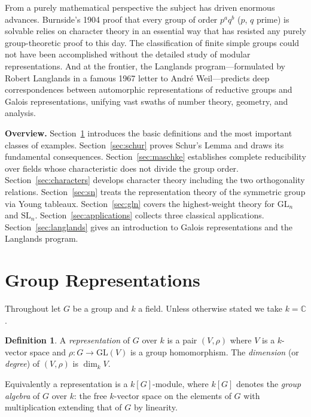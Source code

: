 \documentclass[12pt,a4paper]{amsart}
\theoremstyle{definition}
\newtheorem{definition}[theorem]{Definition}
\begin{document}
From a purely mathematical perspective the subject has driven enormous advances.
Burnside's 1904 proof that every group of order $p^a q^b$ ($p$, $q$ prime) is
solvable relies on character theory in an essential way that has resisted any
purely group-theoretic proof to this day.  The classification of finite simple
groups could not have been accomplished without the detailed study of modular
representations.  And at the frontier, the Langlands program---formulated by
Robert Langlands in a famous 1967 letter to André Weil---predicts deep
correspondences between automorphic representations of reductive groups and Galois
representations, unifying vast swaths of number theory, geometry, and analysis.

\medskip

\noindent\textbf{Overview.}  Section~\ref{sec:basic} introduces the basic
definitions and the most important classes of examples.  Section~\ref{sec:schur}
proves Schur's Lemma and draws its fundamental consequences.
Section~\ref{sec:maschke} establishes complete reducibility over fields whose
characteristic does not divide the group order.  Section~\ref{sec:characters}
develops character theory including the two orthogonality relations.
Section~\ref{sec:sn} treats the representation theory of the symmetric group via
Young tableaux.  Section~\ref{sec:gln} covers the highest-weight theory for
$\mathrm{GL}_n$ and $\mathrm{SL}_n$.  Section~\ref{sec:applications} collects
three classical applications.  Section~\ref{sec:langlands} gives an introduction
to Galois representations and the Langlands program.

\section{Group Representations}
\label{sec:basic}

Throughout let $G$ be a group and $k$ a field.  Unless otherwise stated we take
$k = \mathbb{C}$.

\begin{definition}
A \emph{representation} of $G$ over $k$ is a pair $(V,\rho)$ where $V$ is a
$k$-vector space and $\rho \colon G \to \mathrm{GL}(V)$ is a group homomorphism.
The \emph{dimension} (or \emph{degree}) of $(V,\rho)$ is $\dim_k V$.
\end{definition}

Equivalently a representation is a $k[G]$-module, where $k[G]$ denotes the
\emph{group algebra} of $G$ over $k$: the free $k$-vector space on the elements
of $G$ with multiplication extending that of $G$ by linearity.
\end{document}
